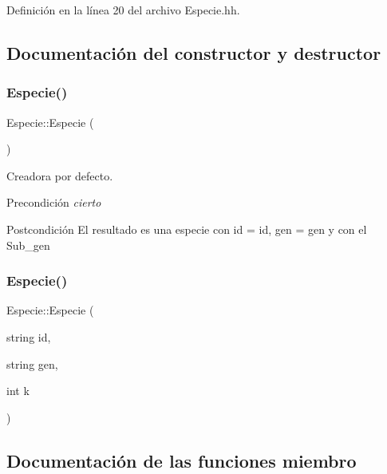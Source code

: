 Definición en la línea 20 del archivo Especie.\+hh.



\subsection{Documentación del constructor y destructor}
\mbox{\label{class_especie_a272c2488719cc9874b2f174906675b3d}} 
\subsubsection{\texorpdfstring{Especie()}{Especie()}\hspace{0.1cm}{\footnotesize\ttfamily [1/2]}}
{\footnotesize\ttfamily Especie\+::\+Especie (\begin{DoxyParamCaption}{ }\end{DoxyParamCaption})}



Creadora por defecto. 

\begin{DoxyPrecond}{Precondición}
{\itshape cierto} 
\end{DoxyPrecond}
\begin{DoxyPostcond}{Postcondición}
El resultado es una especie con id = id, gen = gen y con el Sub\+\_\+gen 
\end{DoxyPostcond}
\mbox{\label{class_especie_ac00e224134b1fd6e12ab653b71fd142d}} 
\subsubsection{\texorpdfstring{Especie()}{Especie()}\hspace{0.1cm}{\footnotesize\ttfamily [2/2]}}
{\footnotesize\ttfamily Especie\+::\+Especie (\begin{DoxyParamCaption}\item[{string}]{id,  }\item[{string}]{gen,  }\item[{int}]{k }\end{DoxyParamCaption})}



\subsection{Documentación de las funciones miembro}
\mbox{\label{class_especie_a68f3f4274cf4f763a03e6cc0d633f25e}} 
